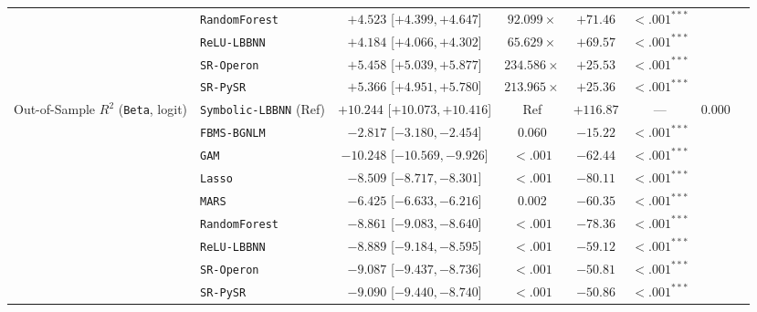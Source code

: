 \begin{table}[htbp]
{{\begin{tabular}{llcccccc}
 & \texttt{RandomForest} & $+4.523$ [$+4.399, +4.647$] & $92.099\times$ & $+71.46$ & $<.001^{***}$ &  \\
 & \texttt{ReLU-LBBNN} & $+4.184$ [$+4.066, +4.302$] & $65.629\times$ & $+69.57$ & $<.001^{***}$ &  \\
 & \texttt{SR-Operon} & $+5.458$ [$+5.039, +5.877$] & $234.586\times$ & $+25.53$ & $<.001^{***}$ &  \\
 & \texttt{SR-PySR} & $+5.366$ [$+4.951, +5.780$] & $213.965\times$ & $+25.36$ & $<.001^{***}$ &  \\
\midrule
Out-of-Sample $R^2$ (\texttt{Beta}, logit) & \texttt{Symbolic-LBBNN} (Ref) & $+10.244$ [$+10.073, +10.416$] & Ref & $+116.87$ & --- & 0.000 \\
 & \texttt{FBMS-BGNLM} & $-2.817$ [$-3.180, -2.454$] & 0.060 & $-15.22$ & $<.001^{***}$ &  \\
 & \texttt{GAM} & $-10.248$ [$-10.569, -9.926$] & $<.001$ & $-62.44$ & $<.001^{***}$ &  \\
 & \texttt{Lasso} & $-8.509$ [$-8.717, -8.301$] & $<.001$ & $-80.11$ & $<.001^{***}$ &  \\
 & \texttt{MARS} & $-6.425$ [$-6.633, -6.216$] & 0.002 & $-60.35$ & $<.001^{***}$ &  \\
 & \texttt{RandomForest} & $-8.861$ [$-9.083, -8.640$] & $<.001$ & $-78.36$ & $<.001^{***}$ &  \\
 & \texttt{ReLU-LBBNN} & $-8.889$ [$-9.184, -8.595$] & $<.001$ & $-59.12$ & $<.001^{***}$ &  \\
 & \texttt{SR-Operon} & $-9.087$ [$-9.437, -8.736$] & $<.001$ & $-50.81$ & $<.001^{***}$ &  \\
 & \texttt{SR-PySR} & $-9.090$ [$-9.440, -8.740$] & $<.001$ & $-50.86$ & $<.001^{***}$ &  \\
\bottomrule
\end{tabular}%
}
}
\end{table}

